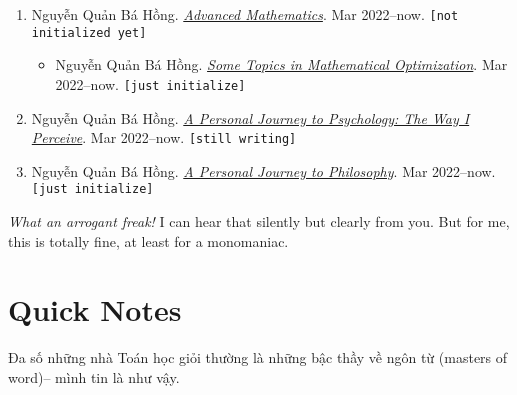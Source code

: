 \documentclass{article}
\numberwithin{equation}{section}
\begin{document}
\begin{enumerate}
\begin{itemize}
	\end{itemize}
	\item Nguyễn Quản Bá Hồng. \href{https://github.com/NQBH/hobby/tree/master/advanced_mathematics}{\textit{Advanced Mathematics}}. Mar 2022--now. \texttt{[not initialized yet]}
	\begin{itemize}
		\item Nguyễn Quản Bá Hồng. \href{https://github.com/NQBH/hobby/blob/master/advanced_mathematics/mathematical_optimization/NQBH_mathematical_optimization.pdf}{\textit{Some Topics in Mathematical Optimization}}. Mar 2022--now. \texttt{[just initialize]}
	\end{itemize}
	\item Nguyễn Quản Bá Hồng. \href{https://github.com/NQBH/hobby/blob/master/psychology/NQBH_a_personal_journey_to_psychology.pdf}{\textit{A Personal Journey to Psychology: The Way I Perceive}}. Mar 2022--now. \texttt{[still writing]}
	\item Nguyễn Quản Bá Hồng. \href{https://github.com/NQBH/hobby/blob/master/philosophy/NQBH_a_personal_journey_to_philosophy.pdf}{\textit{A Personal Journey to Philosophy}}. Mar 2022--now. \texttt{[just initialize]}
\end{enumerate}
\textit{What an arrogant freak!} I can hear that silently but clearly from you. But for me, this is totally fine, at least for a monomaniac.

\section{Quick Notes}
Đa số những nhà Toán học giỏi thường là những bậc thầy về ngôn từ (masters of word)-- mình tin là như vậy.

\appendix

\printbibliography[heading=bibintoc]
	
\end{document}
